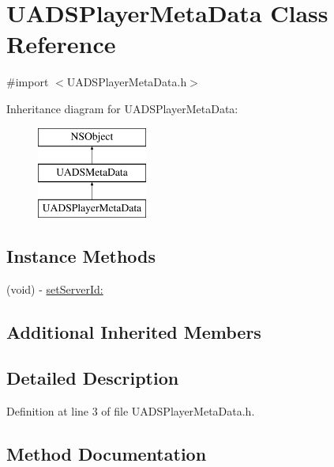 \hypertarget{interface_u_a_d_s_player_meta_data}{}\section{U\+A\+D\+S\+Player\+Meta\+Data Class Reference}
\label{interface_u_a_d_s_player_meta_data}


{\ttfamily \#import $<$U\+A\+D\+S\+Player\+Meta\+Data.\+h$>$}

Inheritance diagram for U\+A\+D\+S\+Player\+Meta\+Data\+:\begin{figure}[H]
\begin{center}
\leavevmode
\includegraphics[height=3.000000cm]{interface_u_a_d_s_player_meta_data}
\end{center}
\end{figure}
\subsection*{Instance Methods}
\begin{DoxyCompactItemize}
\item 
(void) -\/ \mbox{\hyperlink{interface_u_a_d_s_player_meta_data_ace7dacee29102849b754571ea7007464}{set\+Server\+Id\+:}}
\end{DoxyCompactItemize}
\subsection*{Additional Inherited Members}


\subsection{Detailed Description}


Definition at line 3 of file U\+A\+D\+S\+Player\+Meta\+Data.\+h.



\subsection{Method Documentation}
\mbox{\label{interface_u_a_d_s_player_meta_data_ace7dacee29102849b754571ea7007464}} 
